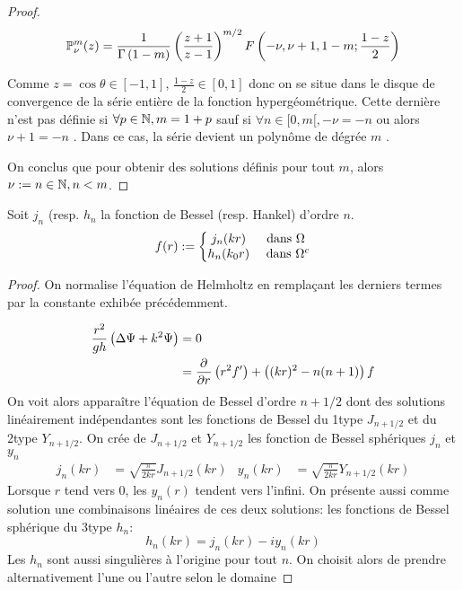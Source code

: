 \begin{proof}
{\[
\mathbb{P}^m_\nu(z) = \dfrac{1}{\Gamma\left(1-m\right)}\left(\dfrac{z+1}{z-1}\right)^{m/2}F\left(-\nu,\nu+1,1-m;\dfrac{1-z}{2}\right)
\]

Comme \(z=\cos\theta \in [-1,1] \), \(\frac{1-z}{2} \in [0,1]\) donc on se situe dans le disque de convergence de la série entière de la fonction hypergéométrique. Cette dernière n'est pas définie si \(\forall p\in \mathbb N, m=1+p \) sauf si \(\forall n \in [0,m[, -\nu = -n \) ou alors \( \nu +1 = -n \) \cite[p.~556]{abramowitz_handbook_1964}. Dans ce cas, la série devient un polynôme de dégrée \(m\) \cite[p.~561]{abramowitz_handbook_1964}.

On conclus que pour obtenir des solutions définis pour tout \(m\), alors \(\nu:=n \in \mathbb N, n< m \).
}


\end{proof}


\begin{prop} Soit \(j_n\) (resp. \(h_n\) la fonction de Bessel (resp. Hankel) d'ordre \(n\).
  \begin{equation}
    f(r) := \left\lbrace
    \begin{matrix}
    j_n(kr) & \text{ dans \(\Omega\) } \\
    h_n(k_0r) & \text{ dans } \Omega^c \\
    \end{matrix}\right.
  \end{equation}
\end{prop}
\begin{proof}
On normalise l'équation de Helmholtz en remplaçant les derniers termes par la constante exhibée précédemment.

\begin{align*}
\dfrac{r^2}{gh} \left(\Delta \Psi + k^2 \Psi\right) &= 0 \\
&= \dfrac{\partial^{{}} }{{\partial r}^{{}}}\left(r^2f'\right) + \left((kr)^2 - n(n+1)\right)f
\end{align*}
  On voit alors apparaître l'équation de Bessel d'ordre \(n +1/2\) dont des solutions linéairement indépendantes sont les fonctions de Bessel du 1\ier type \(J_{n+1/2}\) et du 2\ieme type \(Y_{n+1/2}\)\cite[p.~86]{bohren_absorption_2004}\cite[p.~1465]{morse_methods_1953}. 
  On crée de \(J_{n+1/2}\) et \(Y_{n+1/2}\) les fonction de Bessel sphériques \(j_n\) et \(y_n\) 
  \begin{align*}
  j_n(kr) &= \sqrt{\frac{\pi}{2kr}}J_{n+1/2}(kr) &
  y_n(kr) &= \sqrt{\frac{\pi}{2kr}}Y_{n+1/2}(kr)
  \end{align*}
  Lorsque \(r\) tend vers \(0\), les \(y_n(r)\) tendent vers l'infini. On présente aussi comme solution une combinaisons linéaires de ces deux solutions: les fonctions de Bessel sphérique du 3\ieme type \(h_n\):
  \[
  h_n(kr)=j_n(kr)-i y_n(kr)
  \]
  Les \(h_n\) sont aussi singulières à l'origine pour tout \(n\). On choisit alors de prendre alternativement l'une ou l'autre selon le domaine
  \end{proof}


